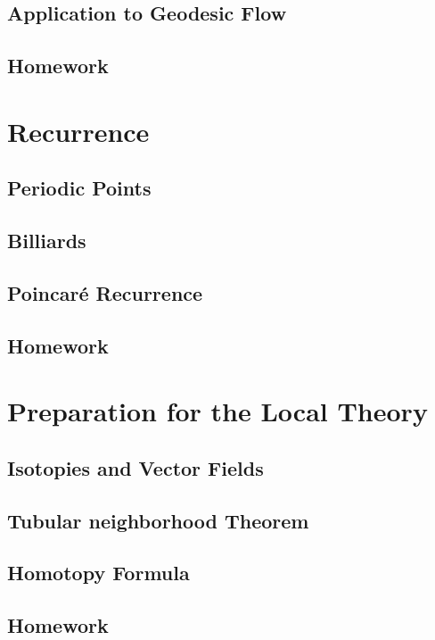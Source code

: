 \documentclass[4paper]{article}
\begin{document}
\subsection{Application to Geodesic Flow}

\subsection{Homework}

\section{Recurrence}

\subsection{Periodic Points}

\subsection{Billiards}

\subsection{Poincar\'{e} Recurrence}

\subsection{Homework}

\section{Preparation for the Local Theory}

\subsection{Isotopies and Vector Fields}

\subsection{Tubular neighborhood Theorem}

\subsection{Homotopy Formula}

\subsection{Homework}
\end{document}
